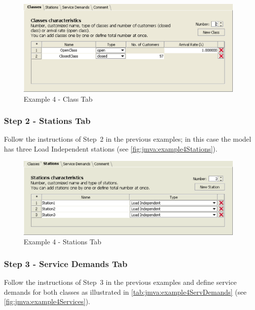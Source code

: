 \begin{figure}[htbp]
    \begin{center}
        \includegraphics[scale=.5]{img/jmva/example4Class}
    \end{center}
    \caption{Example 4 - Class Tab}
    \label{fig:jmva:example4Class}
\end{figure}

\subsubsection{Step 2 - Stations Tab}

Follow the instructions of Step~2 in the previous examples; in this
case the model has three Load Independent stations (see
\autoref{fig:jmva:example4Stations}).

\begin{figure}[htbp]
    \begin{center}
        \includegraphics[scale=.5]{img/jmva/example4Stations}
    \end{center}
    \caption{Example 4 - Stations Tab}
    \label{fig:jmva:example4Stations}
\end{figure}

\subsubsection{Step 3 - Service Demands Tab}

Follow the instructions of Step~3 in the previous examples and
define service demands for both classes as illustrated in
\autoref{tab:jmva:example4ServDemands} (see
\autoref{fig:jmva:example4Services}).

